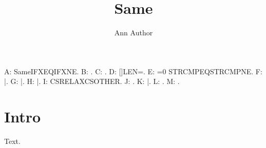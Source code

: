 \documentclass{article}
\title{Same}
\author{Ann Author}
\begin{document}
\def\same{Same}
A: \ifx\@title\same IFXEQ\else IFXNE\fi.
B: .
C: .
D: \StrLen{\@title}[\len]LEN=\len.
E: \ifnum{}=0 STRCMPEQ\else STRCMPNE\fi.
F: \expandafter\@gobble\@title|.
G: \expandafter\@car\@title\@nil|.
H: \expandafter\scantokens\expandafter{\@title}|.
I: \expandafter\ifx\csname\@title\endcsname\relax CSRELAX\else CSOTHER\fi.
J: .
K: |.
L: \settowidth{\dimen0}{\@title}\the{}.
M: \the{}.
\section{Intro}
Text.
\end{document}

